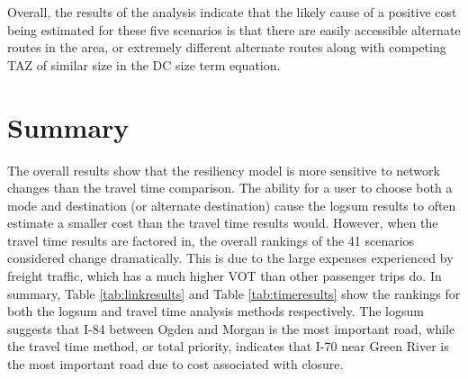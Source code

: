 Overall, the results of the analysis indicate that the likely cause of a
positive cost being estimated for these five scenarios is that there are
easily
accessible alternate routes in the area, or extremely different alternate
routes along with competing TAZ of similar size in the DC size term
equation.

\section{Summary}

The overall results show that the resiliency model is more sensitive to
network changes than the travel time comparison. The ability for a user to
choose both a mode and destination (or alternate destination) cause the
logsum results to often estimate a smaller cost than the travel time
results would. However, when the travel time results are factored in, the
overall rankings of the 41 scenarios considered change dramatically. This
is due to the large expenses experienced by freight traffic, which has a
much higher VOT than other passenger trips do. In summary, Table
\ref{tab:linkresults} and Table \ref{tab:timeresults} show the rankings
for both the logsum and travel time analysis methods respectively. The
logsum suggests that I-84 between Ogden and Morgan is the most important
road, while the travel time method, or total priority, indicates that I-70
near Green River is the most important road due to cost associated with
closure.
